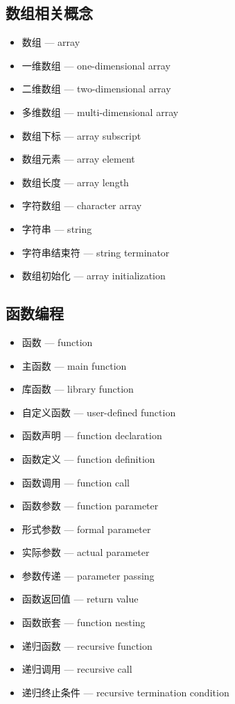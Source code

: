 \subsection{数组相关概念}
\begin{itemize}
\item 数组 — array
\item 一维数组 — one-dimensional array
\item 二维数组 — two-dimensional array
\item 多维数组 — multi-dimensional array
\item 数组下标 — array subscript
\item 数组元素 — array element
\item 数组长度 — array length
\item 字符数组 — character array
\item 字符串 — string
\item 字符串结束符 — string terminator
\item 数组初始化 — array initialization
\end{itemize}

\subsection{函数编程}
\begin{itemize}
\item 函数 — function
\item 主函数 — main function
\item 库函数 — library function
\item 自定义函数 — user-defined function
\item 函数声明 — function declaration
\item 函数定义 — function definition
\item 函数调用 — function call
\item 函数参数 — function parameter
\item 形式参数 — formal parameter
\item 实际参数 — actual parameter
\item 参数传递 — parameter passing
\item 函数返回值 — return value
\item 函数嵌套 — function nesting
\item 递归函数 — recursive function
\item 递归调用 — recursive call
\item 递归终止条件 — recursive termination condition
\end{itemize}

